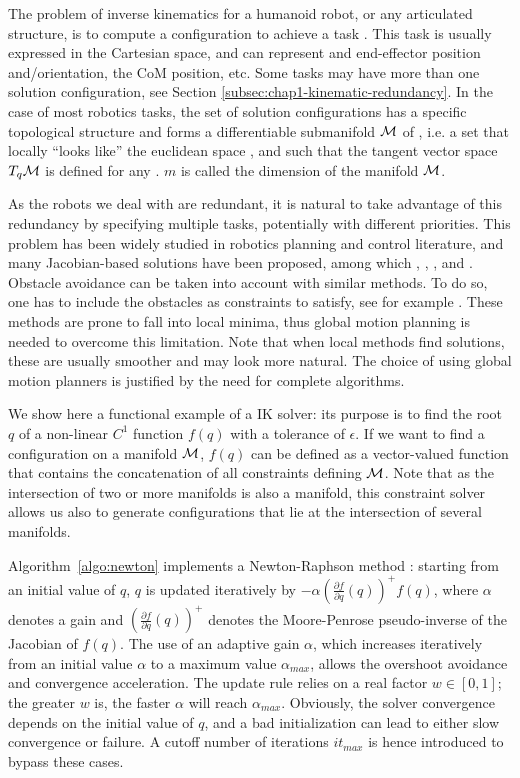The problem of inverse kinematics for a humanoid robot, or any
articulated structure, is to compute a configuration \config{} to
achieve a task \task{}. This task is usually expressed in the
Cartesian space, and can represent and end-effector position
and/orientation, the CoM position, etc. Some tasks may have more than
one solution configuration, see Section
\ref{subsec:chap1-kinematic-redundancy}. In the case of most robotics
tasks, the set of solution configurations has a specific topological
structure and forms a differentiable submanifold $\mathcal{M}$
of \cspace, i.e. a set that locally ``looks like'' the euclidean
space , and such that the tangent vector space
$T_q\mathcal{M}$ is defined for any \config{}. $m$ is called the
dimension of the manifold $\mathcal{M}$.

As the robots we deal with are redundant, it is natural to take
advantage of this redundancy by specifying multiple tasks, potentially
with different priorities. This problem has been widely studied in
robotics planning and control literature, and many Jacobian-based
solutions have been proposed, among which \cite{nakamura1986iks},
\cite{siciliano1991gfm}, \cite{baerlocher1998tpf},
\cite{khatib2004wbd} and \cite{kano09}. Obstacle avoidance can be
taken into account with similar methods. To do so, one has to include
the obstacles as constraints to satisfy, see for example
\cite{kanehiro2008lca}. These methods are prone to fall into local
minima, thus global motion planning is needed to overcome this
limitation. Note that when local methods find solutions, these are
usually smoother and may look more natural. The choice of using global
motion planners is justified by the need for complete algorithms.

We show here a functional example of a IK solver: its
purpose is to find the root $q$ of a non-linear $C^1$ function $f(q)$
with a tolerance of $\epsilon$. If we want to find a configuration on
a manifold $\mathcal{M}$, $f(q)$ can be defined as a vector-valued
function that contains the concatenation of all constraints defining
$\mathcal{M}$. Note that as the intersection of two or more manifolds is
also a manifold, this constraint solver allows us also to generate
configurations that lie at the intersection of several manifolds.

Algorithm~\ref{algo:newton} implements a Newton-Raphson method
\cite{bonnans2006numerical}: starting from an initial value of $q$,
$q$ is updated iteratively by $- \alpha \left(\frac{\partial
  f}{\partial q}(q)\right)^{+} f(q)$, where $\alpha$ denotes a gain
and $\left(\frac{\partial f}{\partial q}(q)\right)^{+}$ denotes the
Moore-Penrose pseudo-inverse of the Jacobian of $f(q)$. The use of an
adaptive gain $\alpha$, which increases iteratively from an initial
value $\alpha$ to a maximum value $\alpha_{max}$, allows the overshoot
avoidance and convergence acceleration. The update rule relies on a
real factor $w \in [0,1]$; the greater $w$ is, the faster $\alpha$
will reach $\alpha_{max}$. Obviously, the solver convergence depends
on the initial value of $q$, and a bad initialization can lead to
either slow convergence or failure. A cutoff number of iterations
$it_{max}$ is hence introduced to bypass these cases.

